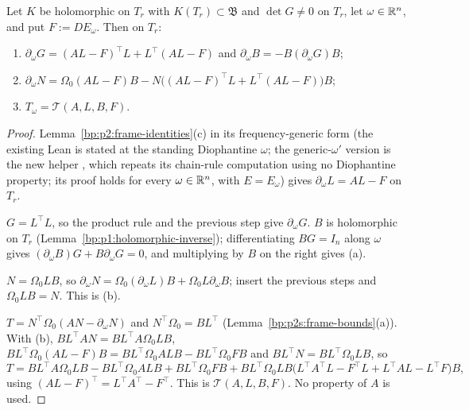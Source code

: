 \begin{lemma}\label{bp:p2s:torsion-identity}
Let $K$ be holomorphic on $T_r$ with $K(T_r)\subset\mathfrak B$ and $\det G\ne0$ on $T_r$, let $\omega\in\mathbb{R}^n$, and
put $F:=DE_\omega$. Then on $T_r$:
\begin{enumerate}[label=(\alph*)]
\item $\partial_\omega G=(AL-F)^\top L+L^\top(AL-F)$ and $\partial_\omega B=-B(\partial_\omega G)B$;
\item $\partial_\omega N=\Omega_0(AL-F)B-N\bigl((AL-F)^\top L+L^\top(AL-F)\bigr)B$;
\item $T_\omega=\mathcal T(A,L,B,F)$.
\end{enumerate}
\end{lemma}

\begin{proof}
\label{step:p2s:ti-dl}
Lemma~\ref{bp:p2:frame-identities}(c) in its frequency-generic form (the existing Lean  is stated at the standing Diophantine $\omega$; the generic-$\omega'$ version is the new helper , which repeats its chain-rule computation using no Diophantine property; its proof holds for every $\omega\in\mathbb{R}^n$, with $E=E_\omega$) gives
$\partial_\omega L=AL-F$ on $T_r$.

\label{step:p2s:ti-db}
$G=L^\top L$, so the product rule and the previous step give $\partial_\omega G$. $B$ is holomorphic on $T_r$
(Lemma~\ref{bp:p1:holomorphic-inverse}); differentiating $BG=I_n$ along $\omega$ gives $(\partial_\omega B)G+B\partial_\omega G=0$,
and multiplying by $B$ on the right gives (a).

\label{step:p2s:ti-dn}
$N=\Omega_0LB$, so $\partial_\omega N=\Omega_0(\partial_\omega L)B+\Omega_0L\partial_\omega B$; insert the previous steps and
$\Omega_0LB=N$. This is (b).

\label{step:p2s:ti-t}
$T=N^\top\Omega_0(AN-\partial_\omega N)$ and $N^\top\Omega_0=BL^\top$ (Lemma~\ref{bp:p2s:frame-bounds}(a)). With (b),
$BL^\top AN=BL^\top A\Omega_0LB$, $BL^\top\Omega_0(AL-F)B=BL^\top\Omega_0ALB-BL^\top\Omega_0FB$ and $BL^\top N=BL^\top\Omega_0LB$, so
\[
T=BL^\top A\Omega_0LB-BL^\top\Omega_0ALB+BL^\top\Omega_0FB+BL^\top\Omega_0LB\bigl(L^\top A^\top L-F^\top L+L^\top AL-L^\top F\bigr)B,
\]
using $(AL-F)^\top=L^\top A^\top-F^\top$. This is $\mathcal T(A,L,B,F)$. No property of $A$ is used.
\end{proof}

